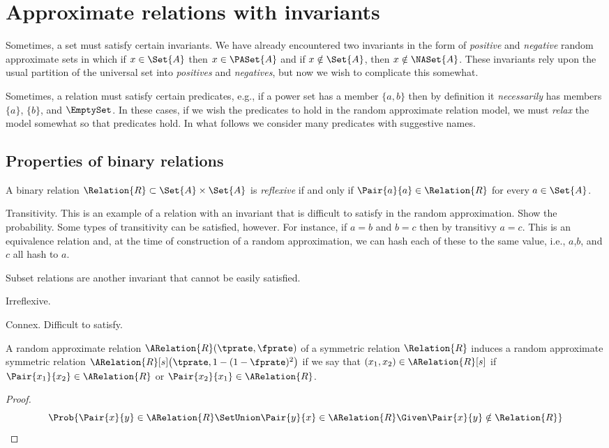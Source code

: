 \documentclass[ ../main.tex]{subfiles}
\begin{document}
\section{Approximate relations with invariants}
Sometimes, a set must satisfy certain invariants.
We have already encountered two invariants in the form of \emph{positive} and \emph{negative} random approximate sets in which if $x \in \Set{A}$ then $x \in \PASet{A}$ and if $x \notin \Set{A}$, then $x \notin \NASet{A}$.
These invariants rely upon the usual partition of the universal set into \emph{positives} and \emph{negatives}, but now we wish to complicate this somewhat.

Sometimes, a relation must satisfy certain predicates, e.g., if a power set has a member $\{a,b\}$ then by definition it \emph{necessarily} has members $\{a\}$, $\{b\}$, and $\EmptySet$.
In these cases, if we wish the predicates to hold in the random approximate relation model, we must \emph{relax} the model somewhat so that predicates hold.
In what follows we consider many predicates with suggestive names.

\subsection{Properties of binary relations}
A binary relation $\Relation{R} \subset \Set{A} \times \Set{A}$ is \emph{reflexive} if and only if $\Pair{a}{a} \in \Relation{R}$ for every $a \in \Set{A}$.



Transitivity. This is an example of a relation with an invariant that is difficult to satisfy in the random approximation. Show the probability.
Some types of transitivity can be satisfied, however. For instance, if $a=b$ and $b=c$ then by transitivy $a=c$. This is an equivalence relation and, at the time of construction of a random approximation, we can hash each of these to the same value, i.e., $a$,$b$, and $c$ all hash to $a$.

Subset relations are another invariant that cannot be easily satisfied.


Irreflexive.

Connex. Difficult to satisfy.


\begin{theorem}
	A random approximate relation $\ARelation{R}(\tprate,\fprate)$ of a symmetric relation $\Relation{R}$ induces a random approximate symmetric relation $\ARelation{R}[s]\!\left(\tprate,1-(1-\fprate)^2\right)$ if we say that $(x_1,x_2) \in \ARelation{R}[s]$ if $\Pair{x_1}{x_2} \in \ARelation{R}$ or $\Pair{x_2}{x_1} \in \ARelation{R}$.
\end{theorem}
\begin{proof}
	\begin{equation}
	\Prob{\Pair{x}{y} \in \ARelation{R} \SetUnion \Pair{y}{x} \in \ARelation{R} \Given \Pair{x}{y} \notin \Relation{R}}
	\end{equation}
\end{proof}
\end{document}
